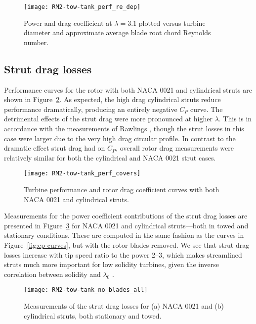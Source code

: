 \begin{figure}
    \centering

    \texttt{[image: RM2-tow-tank\_perf\_re\_dep]}
    
    \caption{Power and drag coefficient at $\lambda=3.1$ plotted versus turbine
        diameter and approximate average blade root chord Reynolds number.}
    
    \label{fig:perf-re-dep}
\end{figure}


\subsection{Strut drag losses}

Performance curves for the rotor with both NACA 0021 and cylindrical struts are
shown in Figure~\ref{fig:perf-covers}. As expected, the high drag cylindrical
struts reduce performance dramatically, producing an entirely negative $C_P$
curve. The detrimental effects of the strut drag were more pronounced at higher
$\lambda$. This is in accordance with the measurements of Rawlings
\cite{Rawlings2008}, though the strut losses in this case were larger due to the
very high drag circular profile. In contrast to the dramatic effect strut drag
had on $C_P$, overall rotor drag measurements were relatively similar for both
the cylindrical and NACA 0021 strut cases.

\begin{figure}
    \centering

    \texttt{[image: RM2-tow-tank\_perf\_covers]}
    
    \caption{Turbine performance and rotor drag coefficient curves with both
        NACA 0021 and cylindrical struts.}
    
    \label{fig:perf-covers}
\end{figure}

Measurements for the power coefficient contributions of the strut drag losses
are presented in Figure~\ref{fig:no-blades} for NACA 0021 and cylindrical
struts---both in towed and stationary conditions. These are computed in the same
fashion as the curves in Figure~\ref{fig:cp-curves}, but with the rotor blades
removed. We see that strut drag losses increase with tip speed ratio to the
power 2--3, which makes streamlined struts much more important for low solidity
turbines, given the inverse correlation between solidity and $\lambda_0$
\cite{Templin1974}.

\begin{figure}
    \centering

    \texttt{[image: RM2-tow-tank\_no\_blades\_all]}
    
    \caption{Measurements of the strut drag losses for (a) NACA 0021 and (b)
        cylindrical struts, both stationary and towed.}
    
    \label{fig:no-blades}
\end{figure}


